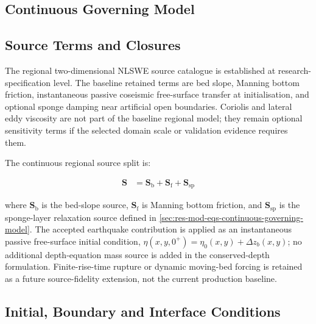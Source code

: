 \subsection{Continuous Governing Model}
\label{sec:res-mod-src-continuous-governing-model}


\subsection{Source Terms and Closures}
\label{sec:res-mod-src-source-terms-closures}

The regional two-dimensional NLSWE source catalogue is established at
research-specification level. The baseline retained terms are bed slope,
Manning bottom friction, instantaneous passive coseismic free-surface
transfer at initialisation, and optional sponge damping near artificial
open boundaries. Coriolis and lateral eddy viscosity are not part of the
baseline regional model; they remain optional sensitivity terms if the
selected domain scale or validation evidence requires them.

The continuous regional source split is:

\begin{align}
  \mathbf{S}
  &=
  \mathbf{S}_{\mathrm{b}}
  +
  \mathbf{S}_{\mathrm{f}}
  +
  \mathbf{S}_{\mathrm{sp}}
  \label{eq:res-mod-src-regional-source-split}
\end{align}

where $\mathbf{S}_{\mathrm{b}}$ is the bed-slope source,
$\mathbf{S}_{\mathrm{f}}$ is Manning bottom friction, and
$\mathbf{S}_{\mathrm{sp}}$ is the sponge-layer relaxation source
defined in \cref{sec:res-mod-eqs-continuous-governing-model}. The
accepted earthquake contribution is applied as an instantaneous passive
free-surface initial condition,
$\eta(x,y,0^+)=\eta_0(x,y)+\Delta z_b(x,y)$; no additional
depth-equation mass source is added in the conserved-depth formulation.
Finite-rise-time rupture or dynamic moving-bed forcing is retained as a
future source-fidelity extension, not the current production baseline.

\subsection{Initial, Boundary and Interface Conditions}
\label{sec:res-mod-src-initial-boundary-interface-conditions}


